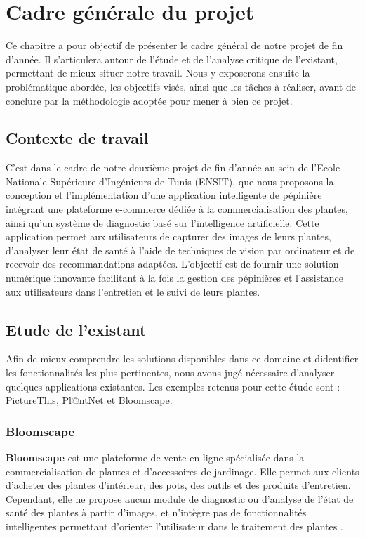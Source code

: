 
\newpage
\chapter{Cadre générale du projet}
 \fontsize{12pt}{12pt}\selectfont

 Ce chapitre a pour objectif de présenter le cadre général de notre projet de fin d'année. Il s'articulera autour 
 de l'étude et de l'analyse critique de l'existant, permettant de mieux situer notre travail. Nous y exposerons 
 ensuite la problématique abordée, les objectifs visés, ainsi que les tâches à réaliser, avant de conclure par la 
 méthodologie adoptée pour mener à bien ce projet.
 \section{Contexte de travail}
 C'est dans le cadre de notre deuxième projet de fin d'année au sein de l'Ecole Nationale Supérieure 
 d'Ingénieurs de Tunis (ENSIT), que nous proposons la conception et l'implémentation d'une application 
 intelligente de pépinière intégrant une plateforme e-commerce dédiée à la commercialisation des plantes, 
 ainsi qu'un système de diagnostic basé sur l'intelligence artificielle. Cette application permet aux 
 utilisateurs de capturer des images de leurs plantes, d'analyser leur état de santé à l'aide de techniques 
 de vision par ordinateur et de recevoir des recommandations adaptées. L'objectif est de fournir une solution 
 numérique innovante facilitant à la fois la gestion des pépinières et l'assistance aux utilisateurs dans l'entretien 
 et le suivi de leurs plantes.
\section{Etude de l'existant}
Afin de mieux comprendre les solutions disponibles dans ce domaine et didentifier les fonctionnalités les 
plus pertinentes, nous avons jugé nécessaire d'analyser quelques applications existantes. Les exemples 
retenus pour cette étude sont : PictureThis, Pl@ntNet et Bloomscape.

\subsection{Bloomscape}
\textbf{Bloomscape} est une plateforme de vente en ligne spécialisée dans la commercialisation de plantes et 
d'accessoires de jardinage. Elle permet aux clients d'acheter des plantes d'intérieur, des pots, des outils 
et des produits d'entretien. Cependant, elle ne propose aucun module de diagnostic ou d'analyse de l'état de 
santé des plantes à partir d'images, et n'intègre pas de fonctionnalités intelligentes permettant d'orienter 
l'utilisateur dans le traitement des plantes \cite{BloomscapeRef}.

